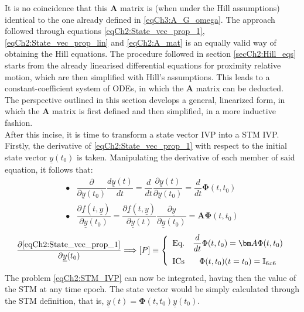 	\indent It is no coincidence that this $\bm A$ matrix is (when under the Hill assumptions) identical to the one already defined in \eqref{eqCh3:A_G_omega}. The approach followed through equations \eqref{eqCh2:State_vec_prop_1}, \eqref{eqCh2:State_vec_prop_lin} and \eqref{eqCh2:A_mat} is an equally valid way of obtaining the Hill equations. The procedure followed in section \ref{secCh2:Hill_eqs} starts from the already linearised differential equations for proximity relative motion, which are then simplified with Hill's assumptions. This leads to a constant-coefficient system of ODEs, in which the $\bm A$ matrix can be deducted. The perspective outlined in this section develops a general, linearized form, in which the $\bm A$ matrix is first defined and then simplified, in a more inductive fashion.\\
	\indent After this incise, it is time to transform a state vector IVP into a STM IVP. Firstly, the derivative of \eqref{eqCh2:State_vec_prop_1} with respect to the initial state vector $\underline{y}(t_0)$ is taken. Manipulating the derivative of each member of said equation, it follows that:
	\[
	\begin{array}{ll}
	\bullet & \dfrac{\partial}{{\partial \underline{y}(t_0)}} \dfrac{d\underline{y}(t)}{dt} = \dfrac{d}{dt}\dfrac{\partial \underline{y}(t)} {{\partial \underline{y}(t_0)}} = \dfrac{d}{dt} \bm \Phi (t, t_0) \\[1.2em]
	\bullet & \dfrac{\partial \underline{f}(t, \underline{y})}{{\partial \underline{y}(t_0)}}  = \dfrac{\partial \underline{f}(t, \underline{y})}{{\partial \underline{y}(t)}} \dfrac{\partial \underline{y}}{{\partial \underline{y}(t_0)}} = \bm A \bm \Phi(t, t_0)
	\end{array}
	\]
	\begin{equation}
	\dfrac{\partial \eqref{eqCh2:State_vec_prop_1}}{\partial \underline{y}(t_0)} \Longrightarrow [P]\equiv\left\{ \begin{array}{lcc}
	\text{Eq.} &  \dfrac{d}{dt} \Phi (t, t_0) = \bm A \Phi (t, t_0)\\[1em]
	\text{ICs} &  \Phi (t, t_0) (t = t_0) = \mathbb{I}_{6x6} 
	\end{array}\right.
	\label{eqCh2:STM_IVP}
	\end{equation}
	\indent The problem \eqref{eqCh2:STM_IVP} can now be integrated, having then the value of the STM at any time epoch. The state vector would be simply calculated through the STM definition, that is, $\underline{y}(t) = \bm \Phi (t, t_0) \underline{y}(t_0)$.
